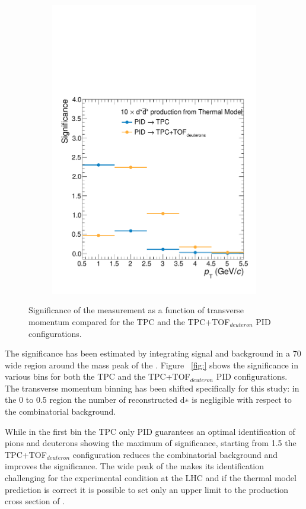 \begin{figure}
\begin{subfigure}{.33\textwidth}
  \includegraphics[width=\linewidth]{gfx/sig_2}
  \caption{}
  \label{fig:tem23}
\end{subfigure}
\caption{Significance of the measurement as a function of transverse momentum compared for the TPC and the TPC+TOF$_{deuteron}$ PID configurations.} %
\label{fig:tem01}
\end{figure}

The significance has been estimated by integrating signal and background in a 70 \mevcs wide region around the
mass peak of the \ds. Figure ~\ref{fig:} shows the significance in various \pt bins for both the TPC and the
TPC+TOF$_{deuteron}$ PID configurations.
The transverse momentum binning has been shifted specifically for this study: in the 0 to 0.5 \pT region the number of reconstructed d∗ is negligible with respect to the combinatorial background.

While in the first \pT bin the TPC only PID guarantees an optimal identification of pions and deuterons showing the 
maximum of significance, starting from 1.5 \gev the TPC+TOF$_{deuteron}$ configuration reduces the combinatorial background
and improves the significance. 
The wide peak of the \ds makes its identification challenging for the experimental condition at the LHC and if the thermal
model prediction is correct it is possible to set only an upper limit to the production cross section of \ds.


